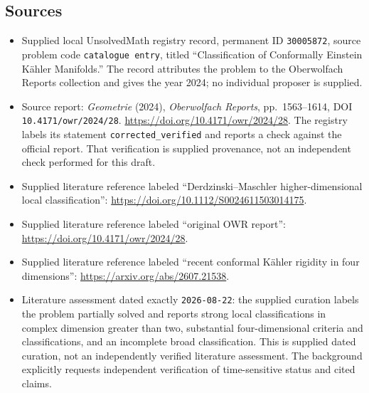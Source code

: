 \documentclass[11pt]{article}
\begin{document}
\subsection{Sources}
\begin{itemize}
\item Supplied local UnsolvedMath registry record, permanent ID \texttt{30005872}, source problem code \texttt{catalogue entry}, titled ``Classification of Conformally Einstein Kähler Manifolds.'' The record attributes the problem to the Oberwolfach Reports collection and gives the year 2024; no individual proposer is supplied.
\item Source report: \emph{Geometrie} (2024), \emph{Oberwolfach Reports}, pp.\ 1563--1614, DOI \texttt{10.4171/owr/2024/28}. \url{https://doi.org/10.4171/owr/2024/28}. The registry labels its statement \texttt{corrected\_verified} and reports a check against the official report. That verification is supplied provenance, not an independent check performed for this draft.
\item Supplied literature reference labeled ``Derdzinski--Maschler higher-dimensional local classification'': \url{https://doi.org/10.1112/S0024611503014175}.
\item Supplied literature reference labeled ``original OWR report'': \url{https://doi.org/10.4171/owr/2024/28}.
\item Supplied literature reference labeled ``recent conformal Kähler rigidity in four dimensions'': \url{https://arxiv.org/abs/2607.21538}.
\item Literature assessment dated exactly \texttt{2026-08-22}: the supplied curation labels the problem partially solved and reports strong local classifications in complex dimension greater than two, substantial four-dimensional criteria and classifications, and an incomplete broad classification. This is supplied dated curation, not an independently verified literature assessment. The background explicitly requests independent verification of time-sensitive status and cited claims.
\end{itemize}
\end{document}
